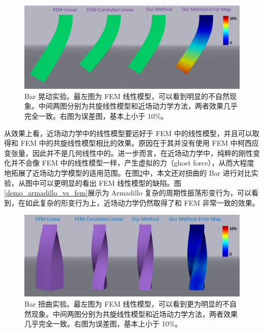 \begin{figure}[!htb]
  \centering
  \captionsetup{justification=centering}
  \includegraphics[width=0.9\linewidth]{chap/image/demo_bar_oscillate_vs_fem}

  \caption{\label{demo_bar_oscillate_vs_fem}
           Bar 晃动实验。最左图为 FEM 线性模型，可以看到明显的不自然现象。中间两图分别为共旋线性模型和近场动力学方法，两者效果几乎完全一致。右图为误差图，基本上小于 10\%。
          }
\end{figure}

从效果上看，近场动力学中的线性模型要远好于 FEM 中的线性模型，并且可以取得和 FEM 中的共旋线性模型相比的效果。原因在于其并没有使用 FEM 中柯西应变张量，因此并不是几何线性中的。进一步而言，在近场动力学中，纯粹的刚性变化并不会像 FEM 中的线性模型一样，产生虚拟的力（ghost force），从而大程度地拓展了近场动力学模型的适用范围。在图\ref{demo_bar_twist_vs_fem}中，本文还对扭曲的 Bar 进行对比实验，从图中可以更明显的看出 FEM 线性模型的缺陷。图\ref{demo_armadillo_vs_fem}展示为 Armadillo 复杂的周期性振荡形变行为，可以看到，在如此复杂的形变行为上，近场动力学仍然取得了和 FEM 非常一致的效果。

\begin{figure}[!htb]
  \centering
  \captionsetup{justification=centering}
  \includegraphics[width=0.9\linewidth]{chap/image/demo_bar_twist_vs_fem}

  \caption{\label{demo_bar_twist_vs_fem}
           Bar 扭曲实验。最左图为 FEM 线性模型，可以看到更为明显的不自然现象。中间两图分别为共旋线性模型和近场动力学方法，两者效果几乎完全一致。右图为误差图，基本上小于 10\%。
          }
\end{figure}

